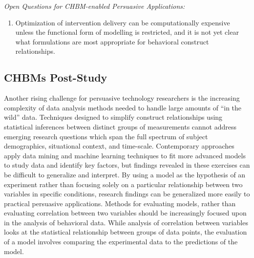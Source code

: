 \documentclass[runningheads,a4paper]{llncs}
\begin{document}
\emph{Open Questions for CHBM-enabled Persuasive Applications:}
\begin{enumerate}
    \item Optimization of intervention delivery can be computationally expensive unless the functional form of modelling is restricted, and it is not yet clear what formulations are most appropriate for behavioral construct relationships.
\end{enumerate}

\subsection{CHBMs Post-Study}
Another rising challenge for persuasive technology researchers is the increasing complexity of data analysis methods needed to handle large amounts of ``in the wild'' data.
Techniques designed to simplify construct relationships using statistical inferences between distinct groups of measurements cannot address emerging research questions which span the full spectrum of subject demographics, situational context, and time-scale. 
Contemporary approaches apply data mining and machine learning techniques to fit more advanced models to study data and identify key factors, but findings revealed in these exercises can be difficult to generalize and interpret.
By using a model as the hypothesis of an experiment rather than focusing solely on a particular relationship between two variables in specific conditions, research findings can be generalized more easily to practical persuasive applications.
Methods for evaluating models, rather than evaluating correlation between two variables should be increasingly focused upon in the analysis of behavioral data.
While analysis of correlation between variables looks at the statistical relationship between groups of data points, the evaluation of a model involves comparing the experimental data to the predictions of the model.
\end{document}
